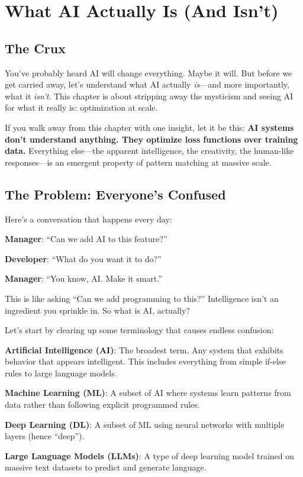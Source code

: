 \chapter{What AI Actually Is (And Isn't)}

\section{The Crux}
You've probably heard AI will change everything. Maybe it will. But before we get carried away, let's understand what AI actually \textit{is}---and more importantly, what it \textit{isn't}. This chapter is about stripping away the mysticism and seeing AI for what it really is: optimization at scale.

If you walk away from this chapter with one insight, let it be this: \textbf{AI systems don't understand anything. They optimize loss functions over training data.} Everything else---the apparent intelligence, the creativity, the human-like responses---is an emergent property of pattern matching at massive scale.

\section{The Problem: Everyone's Confused}

Here's a conversation that happens every day:

\textbf{Manager}: ``Can we add AI to this feature?''

\textbf{Developer}: ``What do you want it to do?''

\textbf{Manager}: ``You know, AI. Make it smart.''

This is like asking ``Can we add programming to this?'' Intelligence isn't an ingredient you sprinkle in. So what is AI, actually?

Let's start by clearing up some terminology that causes endless confusion:

\textbf{Artificial Intelligence (AI)}: The broadest term. Any system that exhibits behavior that appears intelligent. This includes everything from simple if-else rules to large language models.

\textbf{Machine Learning (ML)}: A subset of AI where systems learn patterns from data rather than following explicit programmed rules.

\textbf{Deep Learning (DL)}: A subset of ML using neural networks with multiple layers (hence ``deep'').

\textbf{Large Language Models (LLMs)}: A type of deep learning model trained on massive text datasets to predict and generate language.

